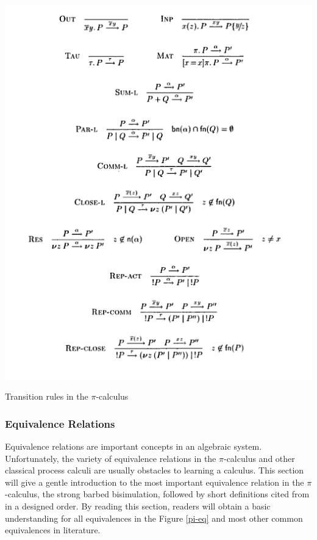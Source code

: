 \vspace{10 mm}

\begin{table}[H]
  \begin{center}
  \includegraphics[scale=0.4]{pi_trans.png}
  \end{center}
  \caption{Transition rules in the $\pi$-calculus}
  \label{pi-trans}
\end{table}


\subsubsection{Equivalence Relations}

Equivalence relations are important concepts in an algebraic system.  Unfortunately, the variety of equivalence relations in the $\pi$-calculus and other classical process calculi are usually obstacles to learning a calculus.  This section will give a gentle introduction to the most important equivalence relation in the $\pi$-calculus, the strong barbed bisimulation, followed by short definitions cited from \cite{pi_book} in a designed order.  By reading this section, readers will obtain a basic understanding for all equivalences in the Figure \ref{pi-eq} and most other common equivalences in literature.


